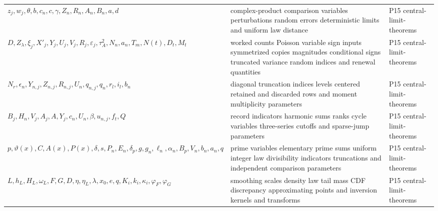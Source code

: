 \begin{longtable}{@{}p{}p{}p{}@{}}
\(z_j,\allowbreak w_j,\allowbreak \theta,\allowbreak b,\allowbreak c_n,\allowbreak c,\allowbreak \gamma,\allowbreak Z_n,\allowbreak R_n,\allowbreak A_n,\allowbreak B_n,\allowbreak a,\allowbreak d\) & complex-product comparison variables perturbations random errors deterministic limits and uniform law distance & P15 central-\allowbreak{}limit-\allowbreak{}theorems \\
\(D,\allowbreak Z_\lambda,\allowbreak \xi_j,\allowbreak X'_j,\allowbreak Y_j,\allowbreak U_j,\allowbreak V_j,\allowbreak R_j,\allowbreak \varepsilon_j,\allowbreak \tau_A^2,\allowbreak N_n,\allowbreak a_n,\allowbreak T_m,\allowbreak N(t),\allowbreak D_t,\allowbreak M_t\) & worked counts Poisson variable sign inputs symmetrized copies magnitudes conditional signs truncated variance random indices and renewal quantities & P15 central-\allowbreak{}limit-\allowbreak{}theorems \\
\(N_r,\allowbreak \epsilon_n,\allowbreak Y_{n,j},\allowbreak Z_{n,j},\allowbreak R_{n,j},\allowbreak U_n,\allowbreak q_{n,j},\allowbreak q_n,\allowbreak r_l,\allowbreak i_l,\allowbreak b_n\) & diagonal truncation indices levels centered retained and discarded rows and moment multiplicity parameters & P15 central-\allowbreak{}limit-\allowbreak{}theorems \\
\(B_j,\allowbreak H_n,\allowbreak V_j,\allowbreak A_j,\allowbreak A,\allowbreak Y_j,\allowbreak c_n,\allowbreak U_n,\allowbreak \beta,\allowbreak u_{n,j},\allowbreak f_t,\allowbreak Q\) & record indicators harmonic sums ranks cycle variables three-series cutoffs and sparse-jump parameters & P15 central-\allowbreak{}limit-\allowbreak{}theorems \\
\(p,\allowbreak \vartheta(x),\allowbreak C,\allowbreak A(x),\allowbreak P(x),\allowbreak \delta,\allowbreak s,\allowbreak P_n,\allowbreak E_n,\allowbreak \delta_p,\allowbreak g,\allowbreak g_n,\allowbreak \ell_n,\allowbreak \alpha_n,\allowbreak B_p,\allowbreak V_n,\allowbreak b_n,\allowbreak a_n,\allowbreak q\) & prime variables elementary prime sums uniform integer law divisibility indicators truncations and independent comparison parameters & P15 central-\allowbreak{}limit-\allowbreak{}theorems \\
\(L,\allowbreak h_L,\allowbreak H_L,\allowbreak \omega_L,\allowbreak F,\allowbreak G,\allowbreak D,\allowbreak \eta,\allowbreak \eta_L,\allowbreak \lambda,\allowbreak x_0,\allowbreak e,\allowbreak q,\allowbreak K_i,\allowbreak k_i,\allowbreak \kappa_i,\allowbreak \varphi_F,\allowbreak \varphi_G\) & smoothing scales density law tail mass CDF discrepancy approximating points and inversion kernels and transforms & P15 central-\allowbreak{}limit-\allowbreak{}theorems \\

\end{longtable}
